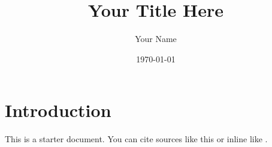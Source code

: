 \documentclass[a4paper,12pt]{article}
\title{Your Title Here}
\author{Your Name}
\date{\today}
\begin{document}
\maketitle

\section{Introduction}

This is a starter document. You can cite sources like this \parencite{knuth1984} or inline like \textcite{knuth1984}.

\printbibliography
\end{document}

